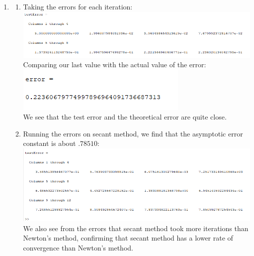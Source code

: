 \documentclass[12pt,letterpaper]{article}
\begin{document}
\begin{enumerate}
        \item 
        \begin{enumerate}
            \item 
            Taking the errors for each iteration: \\
            \includegraphics[scale = .7]{number4.png}\\
            Comparing our last value with the actual value of the error:\\
            \includegraphics{numbe4error.png}\\
            We see that the test error and the theoretical error are quite close. 

            \item 
            Running the errors on secant method, we find that the asymptotic error constant
            is about $.78510$: \\
            \includegraphics[scale = .7]{number5.png}\\
            We also see from the errors that secant method took more iterations than 
            Newton's method, confirming that secant method has a lower rate of convergence
            than Newton's method. 
        \end{enumerate}


\end{enumerate}
\end{document}
